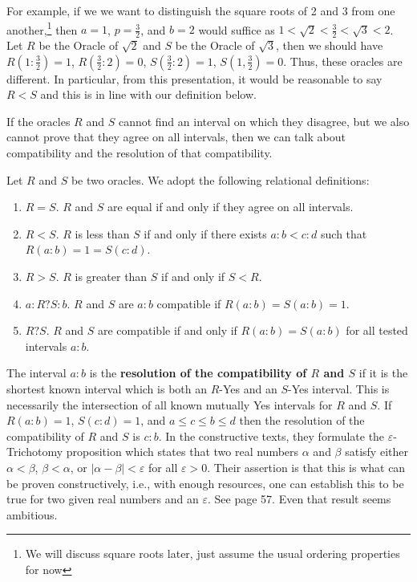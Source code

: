 \documentclass[12pt]{article}
\theoremstyle{remark}
\begin{document}
For example, if we we want to distinguish the square roots of 2 and 3 from one another,\footnote{We will discuss square roots later, just assume the usual ordering properties for now} then $a = 1$, $p = \tfrac{3}{2}$, and $b = 2$ would suffice as $1 < \sqrt{2} < \tfrac{3}{2} < \sqrt{3} < 2$. Let $R$ be the Oracle of $\sqrt{2}$ and $S$ be the Oracle of $\sqrt{3}$, then we should have $R(1:\tfrac{3}{2}) = 1$, $R(\tfrac{3}{2}:2) = 0$,  $S(\tfrac{3}{2}:2) = 1$, $S(1, \tfrac{3}{2}) = 0$. Thus, these oracles are different. In particular, from this presentation, it would be reasonable to say $R < S$ and this is in line with our definition below.

If the oracles $R$ and $S$ cannot find an interval on which they disagree, but we also cannot prove that they agree on all intervals, then we can talk about compatibility and the resolution of that compatibility.

Let $R$ and $S$ be two oracles. We adopt the following relational definitions:

\begin{enumerate}
    \item $R=S$. $R$ and $S$ are equal if and only if they agree on all intervals. 
    \item $R < S$. $R$ is less than $S$ if and only if there exists $a:b < c:d$ such that $R(a:b) =1 = S(c:d)$. 
    \item $R > S$. $R$ is greater than $S$ if and only if $S < R$.
    \item $a:R?S:b$. $R$ and $S$ are $a:b$ compatible if $R(a:b)=S(a:b) = 1$.
    \item $R ? S$. $R$ and $S$ are compatible if and only if $R(a:b) = S(a:b)$ for all tested intervals $a:b$. 
\end{enumerate}

The interval $a:b$ is the \textbf{resolution of the compatibility of $R$ and $S$} if it is the shortest known interval which is both an $R$-Yes and an $S$-Yes interval. This is necessarily the intersection of all known mutually Yes intervals for $R$ and $S$.  If $R(a:b) = 1$, $S(c:d) = 1$, and $ a \leq c \leq b \leq d$ then the resolution of the compatibility of $R$ and $S$ is $c:b$. In the constructive texts, they formulate the $\varepsilon$-Trichotomy proposition which states that two real numbers $\alpha$ and $\beta$ satisfy either $\alpha < \beta$, $\beta < \alpha$, or $|\alpha - \beta| < \varepsilon$ for all $\varepsilon > 0$. Their assertion is that this is what can be proven constructively, i.e., with enough resources, one can establish this to be true for two given real numbers and an $\varepsilon$. See \cite{bridger} page 57. Even that result seems ambitious. 
\end{document}
